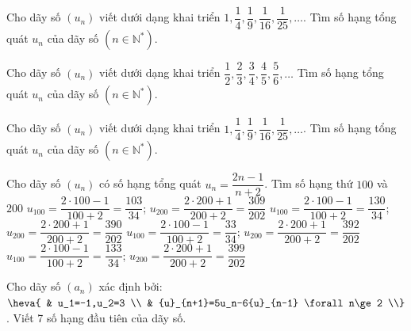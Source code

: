 \begin{bt}%
	Cho dãy số $\left(u_n\right)$ viết dưới dạng khai triển $1,\dfrac{1}{4},\dfrac{1}{9},\dfrac{1}{16},\dfrac{1}{25},\ldots$. Tìm số hạng tổng  quát $u_n$ của dãy số $\left(n\in \mathbb{N}^{\ast}\right)$.
\end{bt}

\begin{ex}%
	Cho dãy số $\left(u_n\right)$ viết dưới dạng  khai triển $\dfrac{1}{2},\dfrac{2}{3},\dfrac{3}{4},\dfrac{4}{5},\dfrac{5}{6},\ldots$ Tìm số hạng tổng quát $u_n$ của dãy số $\left(n\in \mathbb{N}^{\ast}\right)$.
\end{ex}

\begin{ex}%
	 Cho dãy số $\left(u_n\right)$ viết dưới dạng khai triển $1,\dfrac{1}{4},\dfrac{1}{9},\dfrac{1}{16},\dfrac{1}{25},\ldots$. Tìm số hạng tổng quát $u_n$ của dãy số $\left(n\in \mathbb{N}^{\ast}\right)$.
\end{ex}

\begin{ex}%
	Cho dãy số $(u_n)$ có số hạng tổng quát $u_n=\dfrac{2n-1}{n+2}$. Tìm số hạng thứ  $100$ và $200$
	\choice 
		{$u_{100}=\dfrac{2\cdot100-1}{100+2}=\dfrac{103}{34}$; $u_{200}=\dfrac{2\cdot200+1}{200+2}=\dfrac{309}{202}$} 
		 {$u_{100}=\dfrac{2\cdot100-1}{100+2}=\dfrac{130}{34}$; $u_{200}=\dfrac{2\cdot200+1}{200+2}=\dfrac{390}{202}$}
		{$u_{100}=\dfrac{2\cdot100-1}{100+2}=\dfrac{33}{34}$; $u_{200}=\dfrac{2\cdot200+1}{200+2}=\dfrac{392}{202}$} 
		{\True$u_{100}=\dfrac{2\cdot100-1}{100+2}=\dfrac{133}{34}$; $u_{200}=\dfrac{2\cdot200+1}{200+2}=\dfrac{399}{202}$} 
\end{ex}

\begin{bt}%
	Cho dãy số $(a_n)$ xác định bởi: $\heva{ 
	& u_1=-1,u_2=3  \\
	& {u}_{n+1}=5u_n-6{u}_{n-1} \forall n\ge 2 \\}$. Viết 7 số  hạng đầu tiên của dãy số.
\end{bt}

